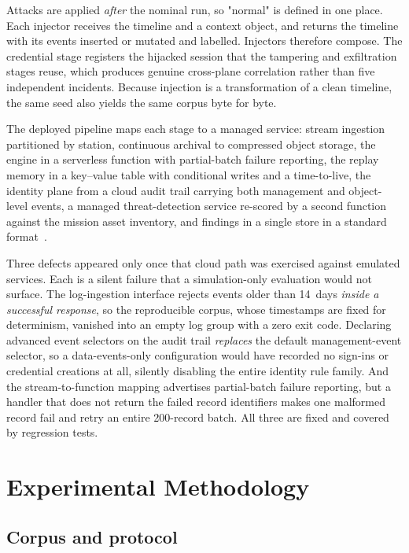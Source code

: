 \documentclass[10pt,journal]{IEEEtran}
\begin{document}
Attacks are applied \emph{after} the nominal run, so "normal" is defined in one
place. Each injector receives the timeline and a context object, and returns the
timeline with its events inserted or mutated and labelled. Injectors therefore
compose. The credential stage registers the hijacked session that the tampering
and exfiltration stages reuse, which produces genuine cross-plane correlation
rather than five independent incidents. Because injection is a transformation
of a clean timeline, the same seed also yields the same corpus byte for byte.

The deployed pipeline maps each stage to a managed service: stream ingestion
partitioned by station, continuous archival to compressed object storage, the
engine in a serverless function with partial-batch failure reporting, the replay
memory in a key--value table with conditional writes and a time-to-live, the
identity plane from a cloud audit trail carrying both management and
object-level events, a managed threat-detection service re-scored by a second
function against the mission asset inventory, and findings in a single store in
a standard format~\cite{asff}.

Three defects appeared only once that cloud path was exercised against emulated
services. Each is a silent failure that a simulation-only evaluation would not
surface. The log-ingestion interface rejects events older than 14~days
\emph{inside a successful response}, so the reproducible corpus, whose
timestamps are fixed for determinism, vanished into an empty log group with a
zero exit code. Declaring advanced event selectors on the audit trail
\emph{replaces} the default management-event selector, so a data-events-only
configuration would have recorded no sign-ins or credential creations at all,
silently disabling the entire identity rule family. And the stream-to-function
mapping advertises partial-batch failure reporting, but a handler that does not
return the failed record identifiers makes one malformed record fail and retry
an entire 200-record batch. All three are fixed and covered by regression
tests.

\section{Experimental Methodology}
\label{sec:method}

\subsection{Corpus and protocol}
\end{document}
